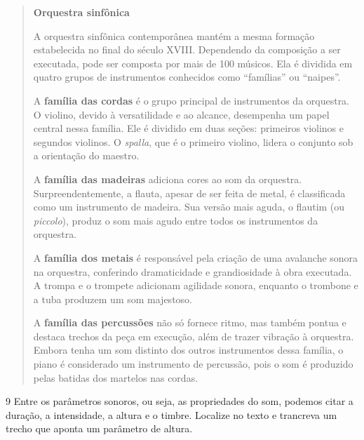 \begin{quote}
\textbf{Orquestra sinfônica}

A orquestra sinfônica contemporânea mantém a mesma formação 
estabelecida no final do século XVIII. Dependendo da composição 
a ser executada, pode ser composta por mais de 100 músicos. Ela 
é dividida em quatro grupos de instrumentos conhecidos como ``famílias'' 
ou ``naipes''.

A \textbf{família das cordas} é o grupo principal de instrumentos 
da orquestra. O violino, devido à versatilidade e ao alcance, desempenha 
um papel central nessa família. Ele é dividido em duas seções: primeiros 
violinos e segundos violinos. O \textit{spalla}, que é o primeiro violino, 
lidera o conjunto sob a orientação do maestro.

A \textbf{família das madeiras} adiciona cores ao som da orquestra. 
Surpreendentemente, a flauta, apesar de ser feita de metal, é classificada 
como um instrumento de madeira. Sua versão mais aguda, o flautim (ou 
\textit{piccolo}), produz o som mais agudo entre todos os instrumentos da 
orquestra.

A \textbf{família dos metais} é responsável pela criação de uma avalanche 
sonora na orquestra, conferindo dramaticidade e grandiosidade à obra executada. 
A trompa e o trompete adicionam agilidade sonora, enquanto o trombone e a tuba 
produzem um som majestoso.

A \textbf{família das percussões} não só fornece ritmo, mas também pontua e destaca 
trechos da peça em execução, além de trazer vibração à orquestra. Embora tenha um 
som distinto dos outros instrumentos dessa família, o piano é considerado um 
instrumento de percussão, pois o som é produzido pelas batidas dos martelos nas 
cordas.

\end{quote}

\num{9} Entre os parâmetros sonoros, ou seja, as propriedades do som, podemos
citar a duração, a intensidade, a altura e o timbre. Localize no texto e
trancreva um trecho que aponta um parâmetro de altura.


